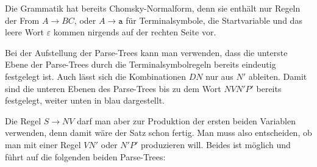\begin{loesung}
\begin{teilaufgaben}
\item
Die Grammatik hat bereits Chomsky-Normalform,
denn sie enthält nur Regeln der From $A\to BC$, oder $A\to\texttt{a}$
für Terminalsymbole, die Startvariable und das leere Wort $\varepsilon$
kommen nirgends auf der rechten Seite vor.
\item
Bei der Aufstellung der Parse-Trees kann man verwenden, dass die unterste
Ebene der Parse-Trees durch die Terminalsymbolregeln bereits eindeutig
festgelegt ist.
Auch lässt sich die Kombinationen $DN$ nur aus $N'$ ableiten.
Damit sind die unteren Ebenen des Parse-Trees bis zu dem Wort
$NVN'P'$
bereits festgelegt, weiter unten in {\color{blue}blau} dargestellt.

Die Regel $S\to NV$ darf man aber zur Produktion der ersten beiden Variablen
verwenden, denn damit wäre der Satz schon fertig. 
Man muss also entscheiden, ob man mit einer Regel $VN'$ oder $N'P'$
produzieren will.
Beides ist möglich und führt auf die folgenden beiden Parse-Trees:
\begin{center}

\end{center}
\end{teilaufgaben}
\end{loesung}
